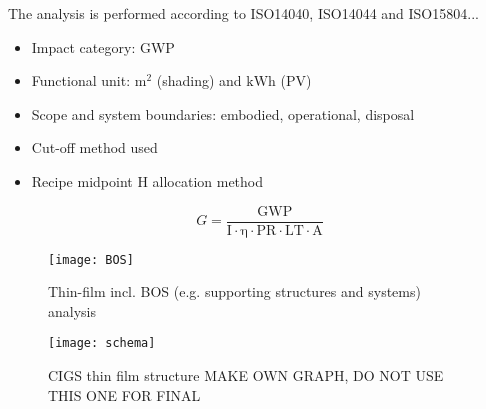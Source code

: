 The analysis is performed according to ISO14040, ISO14044 and ISO15804...

\begin{itemize}
	\item Impact category: GWP
	\item Functional unit: ${\mathrm{m^2}}$ (shading) and ${\mathrm{kWh}}$ (PV)
	\item Scope and system boundaries: embodied, operational, disposal
	\item Cut-off method used
	\item Recipe midpoint H allocation method
\end{itemize}




\begin{equation}
G=\frac{{\mathrm{GWP}}}{{\mathrm{I \cdot \eta  \cdot PR \cdot LT \cdot A}}}
\label{eq:solar}
\end{equation}



\begin{figure}[H]
\begin{center}
\texttt{[image: BOS]}
\caption{Thin-film incl. BOS (e.g. supporting structures and systems) analysis}
\label{fig:BOS}
\end{center}
\end{figure}



\begin{figure}[H]
\begin{center}
\texttt{[image: schema]}
\caption{CIGS thin film structure MAKE OWN GRAPH, DO NOT USE THIS ONE FOR FINAL}
\label{fig:schema}
\end{center}
\end{figure}

